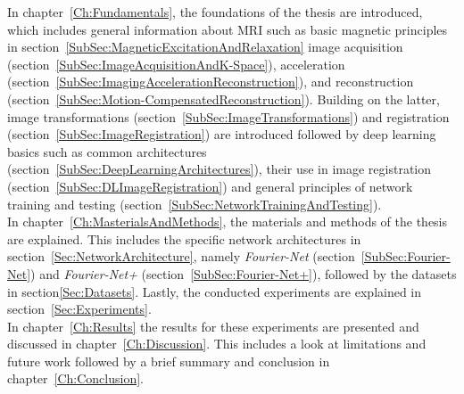 In chapter~\ref{Ch:Fundamentals}, the foundations of the thesis are introduced, which includes general information about MRI such as basic magnetic principles in section~\ref{SubSec:MagneticExcitationAndRelaxation} image acquisition (section~\ref{SubSec:ImageAcquisitionAndK-Space}), acceleration (section~\ref{SubSec:ImagingAccelerationReconstruction}), and reconstruction (section~\ref{SubSec:Motion-CompensatedReconstruction}). Building on the latter, image transformations (section~\ref{SubSec:ImageTransformations}) and registration (section~\ref{SubSec:ImageRegistration}) are introduced followed by deep learning basics such as common architectures (section~\ref{SubSec:DeepLearningArchitectures}), their use in image registration (section~\ref{SubSec:DLImageRegistration}) and general principles of network training and testing (section~\ref{SubSec:NetworkTrainingAndTesting}).\\
In chapter~\ref{Ch:MasterialsAndMethods}, the materials and methods of the thesis are explained. This includes the specific network architectures in section~\ref{Sec:NetworkArchitecture}, namely \emph{Fourier-Net} (section~\ref{SubSec:Fourier-Net}) and \emph{Fourier-Net+} (section~\ref{SubSec:Fourier-Net+}), followed by the datasets in section\ref{Sec:Datasets}.
Lastly, the conducted experiments are explained in section~\ref{Sec:Experiments}.\\
In chapter~\ref{Ch:Results} the results for these experiments are presented and discussed in chapter~\ref{Ch:Discussion}. This includes a look at limitations and future work followed by a brief summary and conclusion in chapter~\ref{Ch:Conclusion}.
